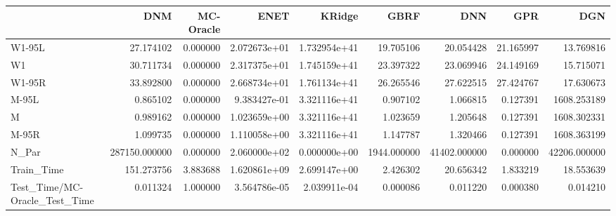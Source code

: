 \begin{tabular}{lrrrrrrrr}
\toprule
{} &            DNM &  MC-Oracle &          ENET &        KRidge &         GBRF &           DNN &        GPR &           DGN \\
\midrule
W1-95L                        &      27.174102 &   0.000000 &  2.072673e+01 &  1.732954e+41 &    19.705106 &     20.054428 &  21.165997 &     13.769816 \\
W1                            &      30.711734 &   0.000000 &  2.317375e+01 &  1.745159e+41 &    23.397322 &     23.069946 &  24.149169 &     15.715071 \\
W1-95R                        &      33.892800 &   0.000000 &  2.668734e+01 &  1.761134e+41 &    26.265546 &     27.622515 &  27.424767 &     17.630673 \\
M-95L                         &       0.865102 &   0.000000 &  9.383427e-01 &  3.321116e+41 &     0.907102 &      1.066815 &   0.127391 &   1608.253189 \\
M                             &       0.989162 &   0.000000 &  1.023659e+00 &  3.321116e+41 &     1.023659 &      1.205648 &   0.127391 &   1608.302331 \\
M-95R                         &       1.099735 &   0.000000 &  1.110058e+00 &  3.321116e+41 &     1.147787 &      1.320466 &   0.127391 &   1608.363199 \\
N\_Par                         &  287150.000000 &   0.000000 &  2.060000e+02 &  0.000000e+00 &  1944.000000 &  41402.000000 &   0.000000 &  42206.000000 \\
Train\_Time                    &     151.273756 &   3.883688 &  1.620861e+09 &  2.699147e+00 &     2.426302 &     20.656342 &   1.833219 &     18.553639 \\
Test\_Time/MC-Oracle\_Test\_Time &       0.011324 &   1.000000 &  3.564786e-05 &  2.039911e-04 &     0.000086 &      0.011220 &   0.000380 &      0.014210 \\
\bottomrule
\end{tabular}
